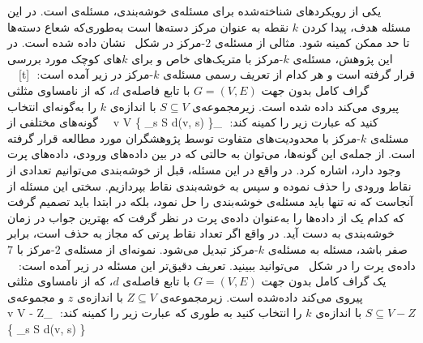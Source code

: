 ‫
‫
‫
‫یکی از رویکردهای شناخته‌شده برای مسئله‌ی خوشه‌بندی، مسئله‌ی  است.
‫در این مسئله هدف، پیدا کردن $k$ نقطه به عنوان مرکز دسته‌ها است به‌طوری‌که شعاع دسته‌ها تا حد ممکن کمینه شود.
‫%
‫%
‫%
‫%
‫مثالی از مسئله‌ی $2$-مرکز در شکل~ نشان داده شده است.
‫در این پژوهش، مسئله‌ی $k$-مرکز با متریک‌های خاص و برای $k$های کوچک مورد بررسی قرار گرفته است و هر کدام از‌
‫تعریف رسمی مسئله‌ی $k$-مرکز در زیر آمده است:
‫
‫[t]
‫
‫\vspace{1em}
‫
‫
‫
‫
‫
‫  گراف کامل بدون جهت $G = (V, E)$ با تابع فاصله‌ی $d$،
‫که از نامساوی مثلثی پیروی می‌کند داده ‌شده است.
‫زیرمجموعه‌ی $S \subseteq V$ با اندازه‌ی $k$ را به‌گونه‌ای انتخاب کنید که عبارت زیر را کمینه کند:
‫
‫\max_{v \in V} \{ \min_{s \in S} d(v, s) \}
‫
‫
‫
‫گونه‌های مختلفی از مسئله‌ی $k$-مرکز با محدودیت‌های متفاوت توسط پژوهشگران مورد مطالعه قرار گرفته است.
‫از جمله‌ی این گونه‌ها، می‌توان به حالتی که در بین داده‌های ورودی، داده‌های پرت وجود دارد، اشاره کرد.
‫در واقع در این مسئله، قبل از خوشه‌بندی می‌توانیم تعدادی از نقاط ورودی را حذف نموده و سپس به خوشه‌بندی نقاط بپردازیم.
‫سختی این مسئله از آنجاست که نه تنها باید مسئله‌ی خوشه‌بندی را حل نمود، بلکه در ابتدا باید تصمیم گرفت که کدام یک از داده‌ها را به‌عنوان داده‌ی پرت در نظر گرفت که بهترین جواب در زمان خوشه‌بندی به دست آید.
‫در واقع اگر تعداد نقاط پرتی که مجاز به حذف است، برابر صفر باشد، مسئله به مسئله‌ی $k$-مرکز تبدیل می‌شود.
‫نمونه‌ای از مسئله‌ی $2$-مرکز با $7$ داده‌ی پرت را در شکل~ می‌توانید ببینید.
‫تعریف دقیق‌تر این مسئله در زیر آمده است:
‫
‫
‫ یک گراف کامل بدون جهت $G = (V, E)$ با تابع فاصله‌ی $d$، که از نامساوی مثلثی پیروی می‌کند داده‌شده است.
‫زیرمجموعه‌ی $Z \subseteq V$ با اندازه‌ی $z$ و  مجموعه‌ی $S \subseteq V - Z$ با اندازه‌ی $k$ را انتخاب کنید به‌ طوری ‌که عبارت زیر را کمینه کند:
‫
‫\max_{v \in V - Z} \{ \min_{s \in S} d(v, s) \}
